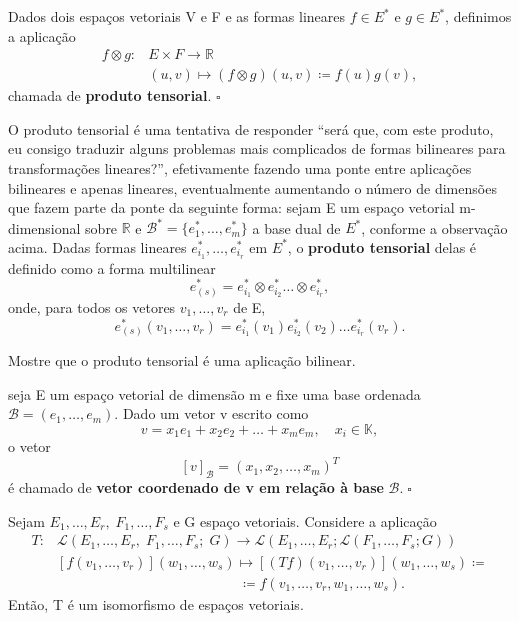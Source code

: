 \documentclass[../differential_forms.tex]{subfiles}
\begin{document}
\begin{def*}
	Dados dois espaços vetoriais V e F e as formas lineares \(f\in E^{*}\) e \(g\in E^{*}\), definimos a aplicação
	\begin{align*}
		f\otimes g: & E\times F\rightarrow\mathbb{R}                          \\
		            & (u, v)\longmapsto (f\otimes g)(u, v)\coloneqq f(u)g(v),
	\end{align*}
	chamada de \textbf{produto tensorial}. \(\square\)
\end{def*}
O produto tensorial é uma tentativa de responder ``será que, com este produto, eu consigo traduzir alguns problemas mais complicados de formas bilineares para transformações lineares?'', efetivamente fazendo uma ponte entre aplicações bilineares e apenas lineares, eventualmente aumentando o número de dimensões que fazem parte da ponte da seguinte forma: sejam E um espaço vetorial m-dimensional sobre \(\mathbb{R}\) e \(\mathcal{B}^{*} = \{e_{1}^{*}, \dotsc , e_{m}^{*}\}\) a base dual de \(E^{*}\), conforme a observação acima. Dadas formas lineares \(e_{i_1}^{*}, \dotsc , e_{i_r}^{*}\) em \(E^{*}\), o \textbf{produto tensorial} delas é definido como a forma multilinear
\[
	e_{(s)}^{*} = e_{i_1}^{*}\otimes e_{i_2}^{*}\dotsc \otimes e_{i_r}^{*},
\]
onde, para todos os vetores \(v_1, \dotsc ,v_r\) de E,
\[
	e_{(s)}^{*}(v_1, \dotsc , v_r) = e_{i_1}^{*}(v_1)e_{i_2}^{*}(v_2)\dotsc e_{i_r}^{*}(v_r).
\]
\begin{exr}
	Mostre que o produto tensorial é uma aplicação bilinear.

\end{exr}
\begin{def*}
	seja E um espaço vetorial de dimensão m e fixe uma base ordenada \(\mathcal{B} = (e_1, \dotsc , e_m)\). Dado um vetor v escrito como
	\[
		v = x_1e_1 + x_2e_2 + \dotsc + x_{m}e_{m},\quad x_{i}\in \mathbb{K},
	\]
	o vetor
	\[
		[v]_{\mathcal{B}} = (x_1, x_2, \dotsc , x_m)^{T}
	\]
	é chamado de \textbf{vetor coordenado de v em relação à base } \(\mathcal{B}.\; \square\)
\end{def*}
\begin{prop*}
	Sejam \(E_1, \dotsc , E_r,\; F_1,\dotsc , F_s\) e G espaço vetoriais. Considere a aplicação
	\begin{align*}
		T: & \mathcal{L}(E_1, \dotsc , E_r,\; F_1, \dotsc , F_s;\;G)\rightarrow \mathcal{L}(E_1, \dotsc , E_r; \mathcal{L}(F_1, \dotsc ,F_s; G)) \\
		   & [f(v_1, \dotsc , v_r)](w_1, \dotsc , w_s)\longmapsto [(Tf)(v_1,\dotsc ,v_r)](w_1,\dotsc ,w_s)\coloneqq                              \\
		   & \quad\quad \quad \quad \quad \quad \quad\quad \quad \quad \quad \quad \quad  \coloneqq f(v_1,\dotsc ,v_r,w_1,\dotsc ,w_s).
	\end{align*}
	Então, T é um isomorfismo de espaços vetoriais.
\end{prop*}
\end{document}
